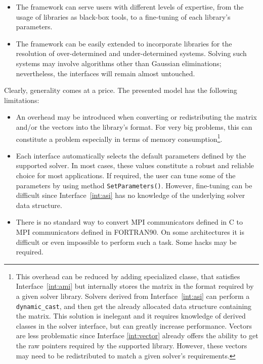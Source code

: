\documentclass[acmtocl]{acmtrans2m}
\begin{document}
\begin{itemize}
\item
The framework can serve users with different levels of expertise, from the
usage of libraries as black-box tools, to a fine-tuning of each library's
parameters.

\item 
The framework can be easily extended to incorporate libraries for the
resolution of over-determined and under-determined systems. Solving such
systems may involve algorithms other than Gaussian eliminations; nevertheless,
the interfaces will remain almost untouched.

\end{itemize}

Clearly, generality comes at a price. The presented model has the following
limitations:
\begin{itemize}
\item
An overhead may be introduced when converting or redistributing the matrix and/or the
vectors into the library's format. For very big problems, this can constitute a
problem especially  in terms of memory consumption\footnote{
This overhead can be reduced by adding specialized classe, that satisfies
  Interface~\ref{int:ami} but internally stores the matrix in the format
  required by a given solver library. Solvers derived from
  Interface~\ref{int:asi} can perform a {\tt
    dynamic\_cast}, and then get the already allocated data structure containing
  the matrix. This solution is inelegant and it requires knowledge of derived
  classes in the solver interface, but can greatly increase performance.
  Vectors are less problematic since Interface \ref{int:vector} already
  offers the ability to get the raw pointers required by the supported library. However, these vectors may
  need to be redistributed to match a given solver's requirements.}.
\item 
Each interface automatically selects the default parameters defined by the
supported solver. In most cases, these values constitute a robust and reliable
choice for most applications. If required, the user can tune some of the
parameters by using method \verb!SetParameters()!. However, fine-tuning can be
difficult since Interface~\ref{int:asi} has no knowledge of the underlying
solver data structure.

\item There
  is no standard way to 
  convert MPI communicators defined in C to MPI communicators defined
  in FORTRAN90. On some architectures it is difficult or even
  impossible to perform such a task. Some hacks may be required.


\end{itemize}
\end{document}

